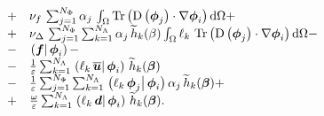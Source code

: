 \documentclass[10pt,a4paper]{article}
\begin{document}
\begin{equation}
\begin{array}{rcl}
 &+& \nu_f\,\sum_{j =1}^{N_\Phi}\alpha_j\,\int_\Omega \trace{\D{\vphi_j}\cdot\grad \vphi_i} \d \Omega + \\
 &+&  \nu_\Delta\,\sum_{j=1}^{N_\Phi} \sum_{k=1}^{N_\Lambda}  \alpha_j\,\th_k(\beta) \int_\Omega \ell_k \, \trace{\D{\vphi_j}\cdot\grad \vphi_i} \d \Omega -\\
&-&\prodscal{\vec f}{\vphi_i}- \\
&-&\frac{1}{\varepsilon} \sum_{k=1}^{N_{\Lambda}}\prodscal{\ell_k\,\bu}{\vphi_i} \,\th_k (\vec \beta)  \\ 
&-& \frac{1}{\varepsilon} \sum_{j=1}^{N_\Phi}\sum_{k=1}^{N_{\Lambda}}\prodscal{\ell_k\,\vphi_j}{\vphi_i} \alpha_j\,\th_k (\vec \beta) + \\
&+& \frac{\omega}{\varepsilon} \sum_{k=1}^{N_{\Lambda}}\prodscal{\ell_k\,\vec d}{\vphi_i} \,\th_k (\vec \beta).
\end{array}
\end{equation}
%
\end{document}
